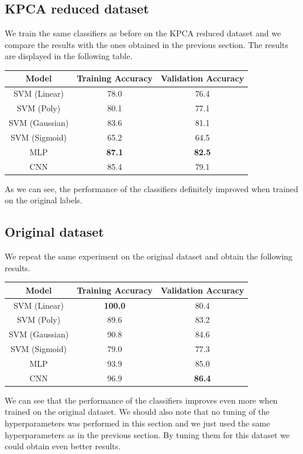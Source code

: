 \subsection{KPCA reduced dataset}
We train the same classifiers as before on the KPCA reduced dataset and
we compare the results with the ones obtained in the previous section.
The results are displayed in the following table.
\begin{table}[H]
    \centering
    \begin{tabular}{|c|c|c|}
        \hline
        Model          & Training Accuracy & Validation Accuracy \\
        \hline
        SVM (Linear)   & 78.0 & 76.4 \\
        SVM (Poly)     & 80.1 & 77.1 \\
        SVM (Gaussian) & 83.6 & 81.1 \\
        SVM (Sigmoid)  & 65.2 & 64.5 \\
        MLP            & \textbf{87.1} & \textbf{82.5} \\
        CNN            & 85.4 & 79.1 \\
        \hline
    \end{tabular}
\end{table}

As we can see, the performance of the classifiers definitely improved
when trained on the original labels.

\subsection{Original dataset}
We repeat the same experiment on the original dataset and obtain the
following results.
\begin{table}[H]
    \centering
    \begin{tabular}{|c|c|c|}
        \hline
        Model          & Training Accuracy & Validation Accuracy \\
        \hline
        SVM (Linear)   & \textbf{100.0} & 80.4 \\
        SVM (Poly)     & 89.6 & 83.2 \\
        SVM (Gaussian) & 90.8 & 84.6 \\
        SVM (Sigmoid)  & 79.0 & 77.3 \\
        MLP            & 93.9 & 85.0 \\
        CNN            & 96.9 & \textbf{86.4} \\
        \hline
    \end{tabular}
\end{table}
We can see that the performance of the classifiers improves even more
when trained on the original dataset. We should also note that no 
tuning of the hyperparameters was performed in this section and we 
just used the same hyperparameters as in the previous section.
By tuning them for this dataset we could obtain even better results.


